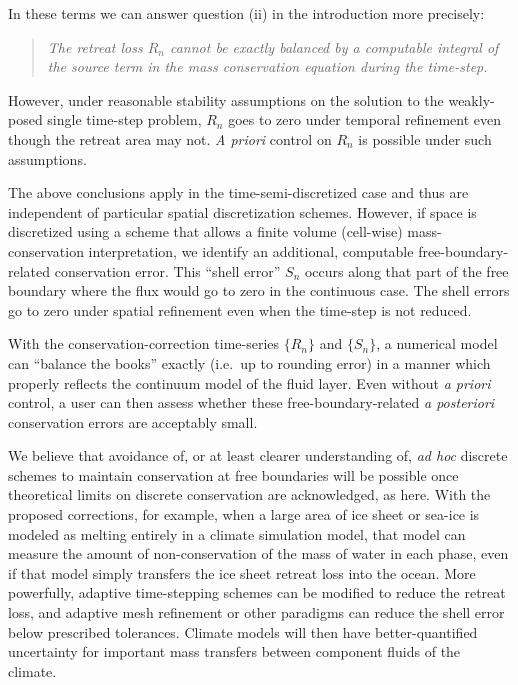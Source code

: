 \documentclass[final,leqno,onefignum,onetabnum]{siamltex1213bueler}
\begin{document}
In these terms we can answer question (ii) in the introduction more precisely:
\begin{quote}
  \emph{The retreat loss $R_n$ cannot be exactly balanced by a computable integral of the source term in the mass conservation equation during the time-step.}
\end{quote}
However, under reasonable stability assumptions on the solution to the weakly-posed single time-step problem,  $R_n$ goes to zero under temporal refinement even though the retreat area may not.  \emph{A priori} control on $R_n$ is possible under such assumptions.

The above conclusions apply in the time-semi-discretized case and thus are independent of particular spatial discretization schemes.  However, if space is discretized using a scheme that allows a finite volume (cell-wise) mass-conservation interpretation, we identify an additional, computable free-boundary-related conservation error.  This ``shell error'' $S_n$ occurs along that part of the free boundary where the flux would go to zero in the continuous case.  The shell errors go to zero under spatial refinement even when the time-step is not reduced.

With the conservation-correction time-series $\{R_n\}$ and $\{S_n\}$, a numerical model can ``balance the books'' exactly (i.e.~up to rounding error) in a manner which properly reflects the continuum model of the fluid layer.  Even without \emph{a priori} control, a user can then assess whether these free-boundary-related \emph{a posteriori} conservation errors are acceptably small.

We believe that avoidance of, or at least clearer understanding of, \emph{ad hoc} discrete schemes to maintain conservation at free boundaries will be possible once theoretical limits on discrete conservation are acknowledged, as here.  With the proposed corrections, for example, when a large area of ice sheet or sea-ice is modeled as melting entirely in a climate simulation model, that model can measure the amount of non-conservation of the mass of water in each phase, even if that model simply transfers the ice sheet retreat loss into the ocean.  More powerfully, adaptive time-stepping schemes can be modified to reduce the retreat loss, and adaptive mesh refinement or other paradigms can reduce the shell error below prescribed tolerances.  Climate models will then have better-quantified uncertainty for important mass transfers between component fluids of the climate.
\end{document}
